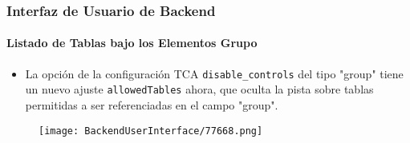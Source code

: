 \begin{frame}[fragile]
	\frametitle{Interfaz de Usuario de Backend}
	\framesubtitle{Listado de Tablas bajo los Elementos Grupo}

	\begin{itemize}

		\item La opción de la configuración TCA \texttt{disable\_controls} del tipo "group"
			tiene un nuevo ajuste \texttt{allowedTables} ahora, que oculta la pista sobre tablas permitidas
			a ser referenciadas en el campo "group".

	\end{itemize}

	\begin{figure}
		\texttt{[image: BackendUserInterface/77668.png]}
	\end{figure}

\end{frame}


